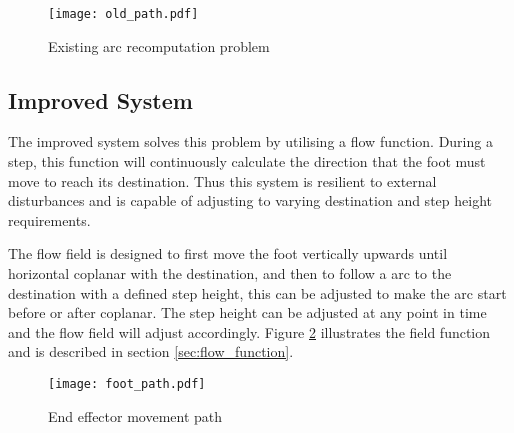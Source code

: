         \begin{figure}[h]
            \centering
            \hspace{-1.38cm}
            \texttt{[image: old\_path.pdf]}
            \caption{Existing arc recomputation problem}
            \label{fig:old_arc}
        \end{figure}

    \subsection{Improved System}
        The improved system solves this problem by utilising a flow function. During a step, this function will continuously calculate the
        direction that the foot must move to reach its destination. Thus this system is resilient to external disturbances and is capable of adjusting to
        varying destination and step height requirements. 
        
        The flow field is designed to first move the foot vertically upwards until horizontal coplanar with the destination, and then to follow a
        arc to the destination with a defined step height, this can be adjusted to make the arc start before or after coplanar. The step height can be adjusted at any point in time and the flow field will adjust accordingly.
        Figure \ref{fig:foot_arc} illustrates the field function and is described in section \ref{sec:flow_function}.
        \begin{figure}[h]
            \centering
            \hspace{-1.38cm}
            \texttt{[image: foot\_path.pdf]}
            \caption{End effector movement path}
            \label{fig:foot_arc}
        \end{figure}

